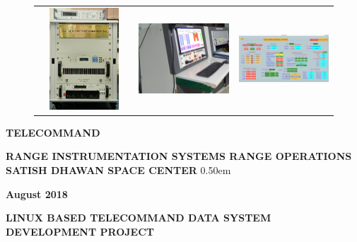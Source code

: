 \documentclass[a4paper, 12pt, oneside]{Thesis}  %
\begin{document}
\begin{center}
\begin{figure}[H]
\begin{tabular}{ccc}
				\includegraphics[height=1.5in,width=1.65in] {./NewPA.jpg}&\includegraphics[height=1.5in,width=1.65in]{./Console1.jpg}&\includegraphics[height=1.5in,width=1.65in]{./MainPage.png}\\
				
			\end{tabular}
			
		\end{figure}
		
		\vspace*{0.25in}
		
	\end{center} 
	\begin{center}
		{\bf \large \MakeUppercase{ TELECOMMAND}\par} 
		{\hspace*{0.4in} \bf RANGE INSTRUMENTATION SYSTEMS \newline RANGE OPERATIONS\\
			SATISH DHAWAN SPACE CENTER}
		\vglue 0.50em
		{\bf \large August 2018\par }%
	\end{center}
	
	
	
	
	\newpage
	\vspace*{36pt}
	\begin{center}
		
		
		\let \footnote \thanks
		\vglue 0in %
		\begin{spacing}{1}
			\textbf{\Large  LINUX BASED TELECOMMAND DATA SYSTEM DEVELOPMENT PROJECT}
		\end{spacing}
		
	\end{center}  
	
\end{document}

